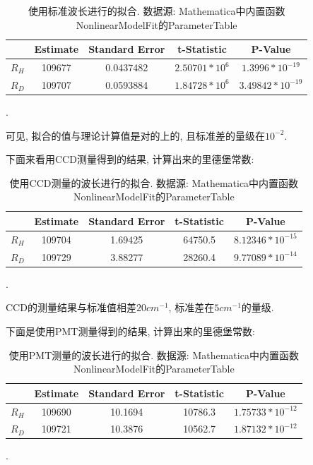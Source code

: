\documentclass[12pt,a4paper]{article}
\begin{document}
\begin{table}[H]
    \centering
    \begin{tabular}{|c|c|c|c|c|}
    \hline
       & Estimate & Standard Error & t-Statistic                   & P-Value                         \\ \hline
    $R_{H}$ & 109677   & 0.0437482      & $2.50701*10^6$ & $1.3996*10^{-19}$  \\ \hline
    $R_{D}$  & 109707   & 0.0593884      & $1.84728*10^6$ & $3.49842*10^{-19}$ \\ \hline
    \end{tabular}
    \caption{使用标准波长进行的拟合. 数据源: Mathematica中内置函数NonlinearModelFit的ParameterTable}.
    \end{table}

可见, 拟合的值与理论计算值是对的上的, 且标准差的量级在$10^{-2}$. 

下面来看用CCD测量得到的结果, 计算出来的里德堡常数: 

\begin{table}[H]
    \centering
    \begin{tabular}{|c|c|c|c|c|}
    \hline
       & Estimate & Standard Error & t-Statistic & P-Value                         \\ \hline
    $R_{H}$ & 109704   & 1.69425        & 64750.5     & $8.12346*10^{-15}$ \\ \hline
    $R_{D}$ & 109729   & 3.88277        & 28260.4     & $9.77089*10^{-14}$ \\ \hline
    \end{tabular}
    \caption{使用CCD测量的波长进行的拟合. 数据源: Mathematica中内置函数NonlinearModelFit的ParameterTable}.
    \end{table}

CCD的测量结果与标准值相差$20cm^{-1}$, 标准差在$5cm^{-1}$的量级. 

下面是使用PMT测量得到的结果, 计算出来的里德堡常数: 

\begin{table}[H]
    \centering
    \begin{tabular}{|c|c|c|c|c|}
    \hline
      & Estimate & Standard Error & t-Statistic & P-Value                         \\ \hline
      $R_{H}$ & 109690   & 10.1694        & 10786.3     & $1.75733*10^{-12}$ \\ \hline
      $R_{D}$  & 109721   & 10.3876        & 10562.7     & $1.87132*10^{-12}$ \\ \hline
    \end{tabular}
    \caption{使用PMT测量的波长进行的拟合. 数据源: Mathematica中内置函数NonlinearModelFit的ParameterTable}.
    \end{table}
\end{document}
